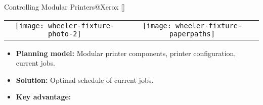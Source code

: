 \begin{frame}{Controlling Modular Printers@Xerox \hfill \scriptsize [\cite{ruml:etal:jair-11}]}

{\small

\vspace{-0.4cm}

\begin{center}
\begin{tabular}{cc}
\texttt{[image: wheeler-fixture-photo-2]} &
\texttt{[image: wheeler-fixture-paperpaths]} 
\end{tabular}
\end{center}

\vspace{-0.1cm}

\begin{itemize}
\item \textbf{Planning model:} Modular printer components, printer
  configuration, current jobs.
\item \textbf{Solution:} Optimal schedule of current jobs.
\item \textbf{Key advantage:} 
\end{itemize}

}

\medskip

\end{frame}


